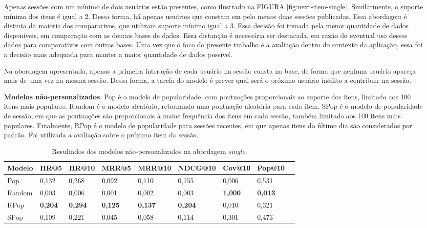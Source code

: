 Apenas sessões com um mínimo de dois usuários estão presentes, como ilustrado na
FIGURA \ref{fig:next-item-single}. Similarmente, o suporte mínimo dos itens é
igual a 2. Dessa forma, há apenas usuários que constam em pelo menos duas
sessões publicadas. Essa abordagem é distinta da maioria dos comparativos, que
utilizam suporte mínimo igual a 3. Essa decisão foi tomada pela menor quantidade
de dados disponíveis, em comparação com as demais bases de dados. Essa distanção
é necessária ser destacada, em razão do eventual uso desses dados
para comparativos com outras bases. Uma vez que o foco do presente trabalho é a
avaliação dentro do contexto da aplicação, essa foi a decisão mais adequada para
manter a maior quantidade de dados possível.

Na abordagem apresentada, apenas a primeira interação de cada usuário na
sessão consta na base, de forma que nenhum usuário apareça mais de uma vez na
mesma sessão. Dessa forma, a tarefa do modelo é prever qual será o próximo usuário
inédito a contribuir na sessão.
 

\textbf{Modelos não-personalizados}: Pop é o modelo de popularidade, com pontuações proporcionais ao suporte dos
  itens, limitado aos 100 itens mais populares. Random é o modelo aleatório,
  retornando uma pontuação aleatória para cada item. SPop é o modelo de
  popularidade de sessão, em que as pontuações são proporcionais à maior
  frequência dos itens em cada sessão, também limitado aos 100 itens mais
  populares. Finalmente, RPop é o modelo de popularidade para sessões recentes,
  em que apenas itens do último dia são considerados por padrão. Foi utilizada a
  avaliação sobre o próximo item da sessão.
\begin{table}[htbp]
  \centering
  \begin{tabular}
    {|l|l|l|l|l|l|l|l|l|}
    \hline
    Modelo & HR@5 & HR@10 & MRR@5 & MRR@10 & NDCG@10 & Cov@10 & Pop@10 \\ \hline
    Pop & 0,132 & 0,268 & 0,092 & 0,110 & 0,155 & 0,006 & 0,531 \\ \hline
    Random & 0,003 & 0,006 & 0,001 & 0,002 & 0,003 & \textbf{1,000} & \textbf{0,013} \\ \hline
    RPop & \textbf{0,204} & \textbf{0,294} & \textbf{0,125} & \textbf{0,137} & \textbf{0,204} & 0,010 & 0,321 \\ \hline
    SPop & 0,109 & 0,221 & 0,045 & 0,058 & 0,114 & 0,301 & 0,473 \\ \hline
  \end{tabular}
  \caption{Resultados dos modelos não-personalizados na abordagem \textit{single}.}
  \label{tab_non_perso}
\end{table}

